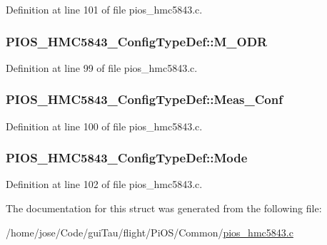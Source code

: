Definition at line 101 of file pios\-\_\-hmc5843.\-c.

\hypertarget{struct_p_i_o_s___h_m_c5843___config_type_def_a29d80c591af9391d345a4f8ef883f67d}{
\subsubsection[{M\-\_\-\-O\-D\-R}]{ P\-I\-O\-S\-\_\-\-H\-M\-C5843\-\_\-\-Config\-Type\-Def\-::\-M\-\_\-\-O\-D\-R}}\label{struct_p_i_o_s___h_m_c5843___config_type_def_a29d80c591af9391d345a4f8ef883f67d}


Definition at line 99 of file pios\-\_\-hmc5843.\-c.

\hypertarget{struct_p_i_o_s___h_m_c5843___config_type_def_a6022f43c01ccf2eb427a5b578ed3e77f}{
\subsubsection[{Meas\-\_\-\-Conf}]{ P\-I\-O\-S\-\_\-\-H\-M\-C5843\-\_\-\-Config\-Type\-Def\-::\-Meas\-\_\-\-Conf}}\label{struct_p_i_o_s___h_m_c5843___config_type_def_a6022f43c01ccf2eb427a5b578ed3e77f}


Definition at line 100 of file pios\-\_\-hmc5843.\-c.

\hypertarget{struct_p_i_o_s___h_m_c5843___config_type_def_a333b4ee7245dcb0c5561f1df9fe8e1fd}{
\subsubsection[{Mode}]{ P\-I\-O\-S\-\_\-\-H\-M\-C5843\-\_\-\-Config\-Type\-Def\-::\-Mode}}\label{struct_p_i_o_s___h_m_c5843___config_type_def_a333b4ee7245dcb0c5561f1df9fe8e1fd}


Definition at line 102 of file pios\-\_\-hmc5843.\-c.



The documentation for this struct was generated from the following file\-:\begin{DoxyCompactItemize}
\item 
/home/jose/\-Code/gui\-Tau/flight/\-Pi\-O\-S/\-Common/\hyperlink{pios__hmc5843_8c}{pios\-\_\-hmc5843.\-c}\end{DoxyCompactItemize}
